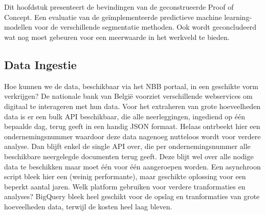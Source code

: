 
\chapter{}%
\label{ch:resultaten}

Dit hoofdstuk presenteert de bevindingen van de geconstrueerde Proof of Concept. Een evaluatie van de geïmplementeerde predictieve machine learning-modellen voor de verschillende segmentatie methoden. Ook wordt geconcludeerd wat nog moet gebeuren voor een meerwaarde in het werkveld te bieden.

\section{Data Ingestie}
Hoe kunnen we de data, beschikbaar via het NBB portaal, in een geschikte vorm verkrijgen? De nationale bank van België voorziet verschillende webservices om digitaal te interageren met hun data.
Voor het extraheren van grote hoeveelheden data is er een bulk API beschikbaar, die alle neerleggingen, ingediend op één bepaalde dag, terug geeft in een handig JSON formaat.
Helaas ontrbeekt hier een ondernemingsnummer waardoor deze data nagenoeg nutteloos wordt voor verdere analyse.
Dan blijft enkel de single API over, die per ondernemingsnummer alle beschikbare neergelegde documenten terug geeft. Deze blijt wel over alle nodige data te beschikken maar moet één voor één aangeroepen worden.
Een asynchroon script bleek hier een (weinig performante), maar geschikte oplossing voor een beperkt aantal jaren.
Welk platform gebruiken voor verdere tranformaties en analyses? BigQuery bleek heel geschikt voor de opslag en tranformaties van grote hoeveelheden data, terwijl de kosten heel laag bleven.

